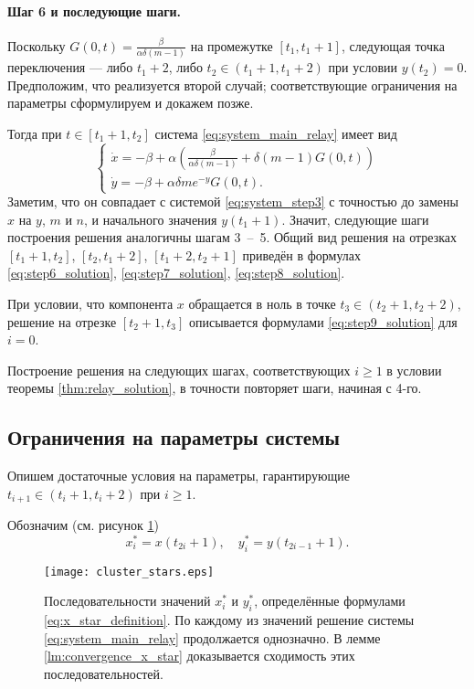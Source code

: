 \paragraph{Шаг 6 и последующие шаги.} Поскольку $G(0, t) = \frac{\beta}{\alpha \delta (m - 1)}$ на промежутке $[t_1, t_1 + 1]$, следующая точка переключения --- либо $t_1 + 2$, либо $t_2 \in (t_1 + 1, t_1 + 2)$ при условии $y(t_2) = 0$. Предположим, что реализуется второй случай; соответствующие ограничения на параметры сформулируем и докажем позже.

Тогда при $t \in [t_1 + 1, t_2]$ система \eqref{eq:system_main_relay} имеет вид
%
\begin{equation}
	\label{eq:step6_system}
	\begin{cases}
		\dot{x} = -\beta + \alpha \left(\frac{\beta}{\alpha \delta (m - 1)} + \delta (m - 1) G(0, t)\right)\\
		\dot{y} = -\beta + \alpha \delta m e^{-y} G(0, t).
	\end{cases}
\end{equation}
%
Заметим, что он совпадает с системой \eqref{eq:system_step3} с точностью до замены $x$ на $y$, $m$ и $n$, и начального значения $y(t_1 + 1)$. Значит, следующие шаги построения решения аналогичны шагам 3~--~5. Общий вид решения на отрезках $[t_1 + 1, t_2]$, $[t_2, t_1 + 2]$, $[t_1 + 2, t_2 + 1]$ приведён в формулах \eqref{eq:step6_solution}, \eqref{eq:step7_solution},  \eqref{eq:step8_solution}.

При условии, что компонента $x$ обращается в ноль в точке $t_3 \in (t_2 + 1, t_2 + 2)$, решение на отрезке $[t_2 + 1, t_3]$ описывается формулами \eqref{eq:step9_solution} для $i = 0$.

Построение решения на следующих шагах, соответствующих $i \geqslant 1$ в условии теоремы \ref{thm:relay_solution}, в точности повторяет шаги, начиная с 4-го.

\subsection{Ограничения на параметры системы}
Опишем достаточные условия на параметры, гарантирующие $t_{i + 1} \in (t_i + 1, t_i + 2)$ при $i \geqslant 1$.

Обозначим (см. рисунок \ref{fig:x_star})
\begin{equation}
	\label{eq:x_star_definition}
	x^*_i = x(t_{2i} + 1), \quad y^*_i = y(t_{2i - 1} + 1).
\end{equation}

\begin{figure}
	\centering
	\texttt{[image: cluster\_stars.eps]}
	\caption{Последовательности значений $x^*_i$ и $y^*_i$, определённые формулами \eqref{eq:x_star_definition}. По каждому из значений решение системы \eqref{eq:system_main_relay} продолжается однозначно. В лемме \ref{lm:convergence_x_star} доказывается сходимость этих последовательностей.}
	\label{fig:x_star}
\end{figure}

